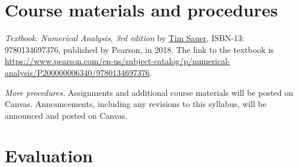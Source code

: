 \documentclass[letterpaper,10pt]{article}
\begin{document}
\section*{Course materials and procedures}

\emph{Textbook.} \emph{Numerical Analysis, 3rd edition}
by 
\href{http://math.gmu.edu/~tsauer/}{Tim Sauer}, 
ISBN-13: 9780134697376, published by Pearson, in 2018.
The link to the textbook is \url{https://www.pearson.com/en-us/subject-catalog/p/numerical-analysis/P200000006340/9780134697376}.

%

\emph{More procedures.} 
Assignments and additional course materials will be posted on Canvas.
Announcements, including any revisions to this syllabus, will be announced and
posted on Canvas.

\section*{Evaluation}
\end{document}
